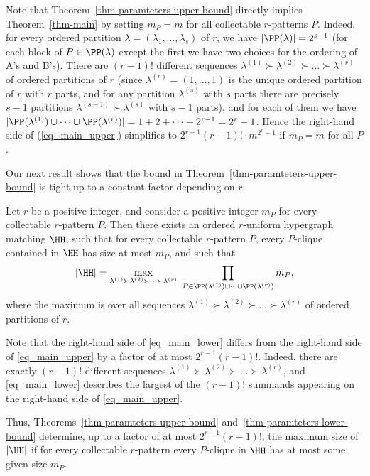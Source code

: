 Note that Theorem~\ref{thm-paramteters-upper-bound} directly implies Theorem~\ref{thm-main} by setting $m_P=m$ for all collectable $r$-patterns $P$. Indeed, for every ordered partition $\lambda=(\lambda_1,\dots,\lambda_s)$ of $r$, we have $|\PP(\lambda)|=2^{s-1}$ (for each block of $P \in \PP(\lambda)$ except the first we have two choices for the ordering of A's and B's). There are $(r-1)!$ different sequences $\lambda^{(1)} \succ \lambda^{(2)} \succ \dots \succ \lambda^{(r)}$ of ordered partitions of $r$ (since $\lambda^{(r)}=(1,\dots,1)$ is the unique ordered partition of $r$ with $r$ parts, and for any partition $\lambda^{(s)}$ with $s$ parts there are precisely $s-1$ partitions $\lambda^{(s-1)} \succ \lambda^{(s)}$ with $s-1$ parts), and for each of them we have $|\PP(\lambda^{(1)})\cup\dots\cup \PP(\lambda^{(r)})|=1+2+\dots+2^{r-1}=2^r-1$. Hence the right-hand side of (\ref{eq_main_upper}) simplifies to $2^{r-1}(r-1)!\cdot m^{2^r-1}$ if $m_P=m$ for all $P$.

Our next result shows that the bound in Theorem~\ref{thm-paramteters-upper-bound} is tight up to a constant factor depending on $r$.

\begin{theorem} \label{thm-paramteters-lower-bound}
Let $r$ be a positive integer, and consider a positive integer $m_P$ for every collectable $r$-pattern $P$. Then there exists an  ordered $r$-uniform hypergraph matching $\HH$, such that for every collectable $r$-pattern $P$, every $P$-clique contained in $\HH$ has size at most $m_P$, and such that
\begin{equation}\label{eq_main_lower}
|\HH|= \max_{\lambda^{(1)} \succ \lambda^{(2)} \succ \dots \succ \lambda^{(r)}}\ \prod_{P\in \PP(\lambda^{(1)})\cup\dots\cup \PP(\lambda^{(r)})} m_{P},
\end{equation}
where the maximum is over all sequences $\lambda^{(1)} \succ \lambda^{(2)} \succ \dots \succ \lambda^{(r)}$ of ordered partitions of $r$.
\end{theorem}

Note that the right-hand side of \eqref{eq_main_lower} differs from the right-hand side of \eqref{eq_main_upper} by a factor of at most $2^{r-1}(r-1)!$. Indeed, there are exactly $(r-1)!$ different sequences $\lambda^{(1)} \succ \lambda^{(2)} \succ \dots \succ \lambda^{(r)}$, and \eqref{eq_main_lower} describes the largest of the $(r-1)!$ summands appearing on the right-hand side of \eqref{eq_main_upper}.

Thus, Theorems~\ref{thm-paramteters-upper-bound} and~\ref{thm-paramteters-lower-bound} determine, up to a factor of at most $2^{r-1}(r-1)!$, the maximum size of $|\HH|$ if for every collectable $r$-pattern every $P$-clique in $\HH$ has at most some given size $m_P$.

